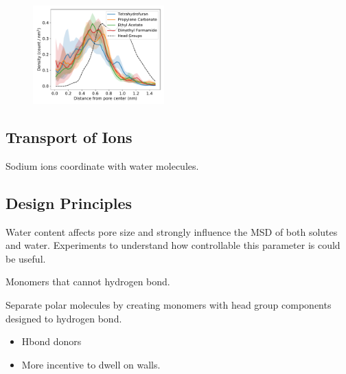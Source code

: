 \documentclass{article}
\begin{document}
  \begin{figure}
  \centering
  \includegraphics[width=0.45\textwidth]{nondonors_rdf.pdf}
  \caption{}\label{fig:nondonors_rdf}
  \end{figure}
  
  

  \subsection*{Transport of Ions} %

  Sodium ions coordinate with water molecules.


  \subsection{Design Principles}

  Water content affects pore size and strongly influence the MSD of both solutes and
  water. Experiments to understand how controllable this parameter is could be useful.
  
  Monomers that cannot hydrogen bond. %

  Separate polar molecules by creating monomers with head group components designed to
  hydrogen bond.
  \begin{itemize}
  	\item Hbond donors
	\item More incentive to dwell on walls.
  \end{itemize}
\end{document}
